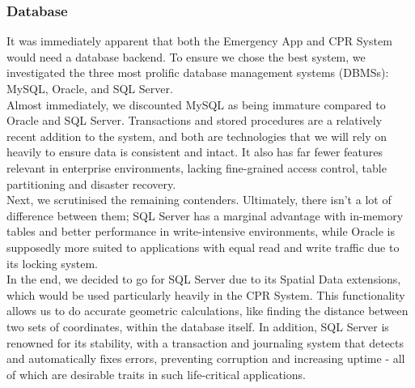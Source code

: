 \documentclass{article}
\begin{document}
	\subsubsection{Database}
	It was immediately apparent that both the Emergency App and CPR System would need a database backend. To ensure we chose the best system, we investigated the three most prolific database management systems (DBMSs): MySQL, Oracle, and SQL Server.\\

Almost immediately, we discounted MySQL as being immature compared to Oracle and SQL Server. Transactions and stored procedures are a relatively recent addition to the system, and both are technologies that we will rely on heavily to ensure data is consistent and intact. It also has far fewer features relevant in enterprise environments, lacking fine-grained access control, table partitioning and disaster recovery.\\

Next, we scrutinised the remaining contenders. Ultimately, there isn’t a lot of difference between them; SQL Server has a marginal advantage with in-memory tables and better performance in write-intensive environments, while Oracle is supposedly more suited to applications with equal read and write traffic due to its locking system.\\

In the end, we decided to go for SQL Server due to its Spatial Data extensions, which would be used particularly heavily in the CPR System. This functionality allows us to do accurate geometric calculations, like finding the distance between two sets of coordinates, within the database itself. In addition, SQL Server is renowned for its stability, with a transaction and journaling system that detects and automatically fixes errors, preventing corruption and increasing uptime - all of which are desirable traits in such life-critical applications.\\
	
\end{document}
